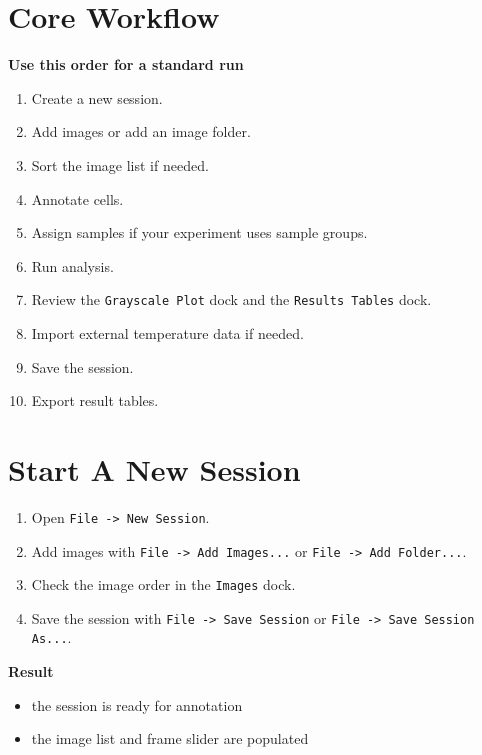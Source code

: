 \documentclass[
  9pt,
  letterpaper,
  oneside,
  open=any,
  DIV=15,
  parskip=half-,
  headings=big,
  numbers=noenddot
]{scrbook}
\newcommand{\manuallead}[1]{%
  \vspace{0.15em}%
  {\sffamily\bfseries\color{ManualBlue}#1}\par\nobreak\vspace{0.05em}%
}
\begin{document}
\section{Core Workflow}

\manuallead{Use this order for a standard run}

\begin{enumerate}[leftmargin=*,itemsep=0.35em,topsep=0.4em]
\item Create a new session.
\item Add images or add an image folder.
\item Sort the image list if needed.
\item Annotate cells.
\item Assign samples if your experiment uses sample groups.
\item Run analysis.
\item Review the \texttt{Grayscale Plot} dock and the \texttt{Results Tables} dock.
\item Import external temperature data if needed.
\item Save the session.
\item Export result tables.
\end{enumerate}

\section{Start A New Session}

\begin{enumerate}[leftmargin=*,itemsep=0.35em,topsep=0.4em]
\item Open \texttt{File -> New Session}.
\item Add images with \texttt{File -> Add Images...} or \texttt{File -> Add Folder...}.
\item Check the image order in the \texttt{Images} dock.
\item Save the session with \texttt{File -> Save Session} or \texttt{File -> Save Session As...}.
\end{enumerate}

\manuallead{Result}

\begin{itemize}[leftmargin=*,itemsep=0.35em,topsep=0.4em]
\item the session is ready for annotation
\item the image list and frame slider are populated
\end{itemize}
\end{document}
